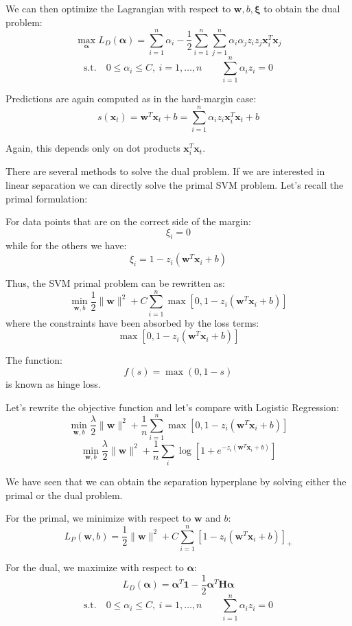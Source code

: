 We can then optimize the Lagrangian with respect to $\mathbf{w}, b, \boldsymbol{\xi}$ to obtain the dual
problem:
\[
\max_{\boldsymbol{\alpha}} L_D(\boldsymbol{\alpha}) = \sum_{i=1}^n \alpha_i - \frac{1}{2}\sum_{i=1}^n\sum_{j=1}^n \alpha_i \alpha_j z_i z_j \mathbf{x}_i^T \mathbf{x}_j
\]
\[
\text{s.t.} \quad 0 \leq \alpha_i \leq C,\ i = 1,\ldots,n \qquad \sum_{i=1}^n \alpha_i z_i = 0
\]

Predictions are again computed as in the hard-margin case:
\[
s(\mathbf{x}_t) = \mathbf{w}^T \mathbf{x}_t + b = \sum_{i=1}^n \alpha_i z_i \mathbf{x}_i^T \mathbf{x}_t + b
\]

Again, this depends only on dot products $\mathbf{x}_i^T \mathbf{x}_t$.

There are several methods to solve the dual problem. If we are interested in linear
separation we can directly solve the primal SVM problem. Let's recall the primal
formulation:

For data points that are on the correct side of the margin:
\[
\xi_i = 0
\]
while for the others we have:
\[
\xi_i = 1 - z_i(\mathbf{w}^T \mathbf{x}_i + b)
\]

Thus, the SVM primal problem can be rewritten as:
\[
\min_{\mathbf{w},b} \frac{1}{2}\|\mathbf{w}\|^2 + C\sum_{i=1}^n \max\left[0, 1 - z_i(\mathbf{w}^T \mathbf{x}_i + b)\right]
\]
where the constraints have been absorbed by the loss terms:
\[
\max\left[0, 1 - z_i(\mathbf{w}^T \mathbf{x}_i + b)\right]
\]

The function:
\[
f(s) = \max(0, 1-s)
\]
is known as hinge loss.

Let's rewrite the objective function and let's compare with Logistic Regression:
\[
\min_{\mathbf{w},b} \frac{\lambda}{2}\|\mathbf{w}\|^2 + \frac{1}{n}\sum_{i=1}^n \max\left[0, 1 - z_i(\mathbf{w}^T \mathbf{x}_i + b)\right]
\]
\[
\min_{\mathbf{w},b} \frac{\lambda}{2}\|\mathbf{w}\|^2 + \frac{1}{n}\sum_i \log\left[1 + e^{-z_i(\mathbf{w}^T \mathbf{x}_i + b)}\right]
\]

We have seen that we can obtain the separation hyperplane by solving either the primal or
the dual problem.

For the primal, we minimize with respect to $\mathbf{w}$ and $b$:
\[
L_P(\mathbf{w}, b) = \frac{1}{2}\|\mathbf{w}\|^2 + C\sum_{i=1}^n \left[1 - z_i(\mathbf{w}^T \mathbf{x}_i + b)\right]_+
\]

For the dual, we maximize with respect to $\boldsymbol{\alpha}$:
\[
L_D(\boldsymbol{\alpha}) = \boldsymbol{\alpha}^T \mathbf{1} - \frac{1}{2}\boldsymbol{\alpha}^T \mathbf{H} \boldsymbol{\alpha}
\]
\[
\text{s.t.} \quad 0 \leq \alpha_i \leq C,\ i = 1,\ldots,n \qquad \sum_{i=1}^n \alpha_i z_i = 0
\]


